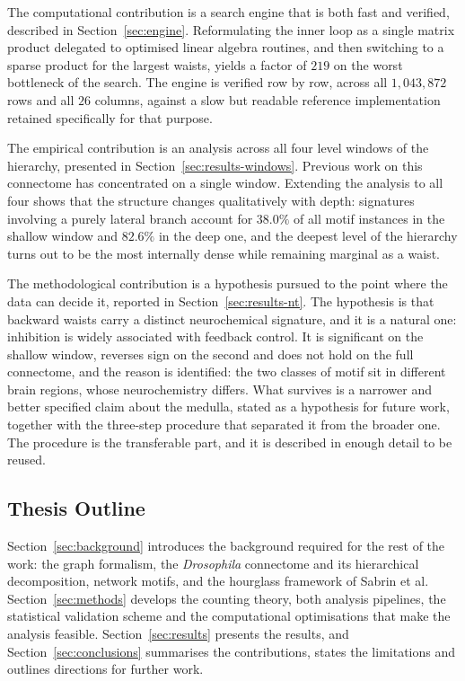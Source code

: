 \documentclass[12pt,a4paper,oneside]{article}
\theoremstyle{definition}
\theoremstyle{plain}
\newcommand{\Dros}{\textit{Drosophila}}
\begin{document}
The computational contribution is a search engine that is both fast and
verified, described in Section~\ref{sec:engine}. Reformulating the inner
loop as a single matrix product delegated to optimised linear algebra
routines, and then switching to a sparse product for the largest waists,
yields a factor of $219$ on the worst bottleneck of the search. The engine
is verified row by row, across all $1{,}043{,}872$ rows and all $26$
columns, against a slow but readable reference implementation retained
specifically for that purpose.

The empirical contribution is an analysis across all four level windows of
the hierarchy, presented in Section~\ref{sec:results-windows}. Previous work
on this connectome has concentrated on a single window. Extending the
analysis to all four shows that the structure changes qualitatively with
depth: signatures involving a purely lateral branch account for $38.0\%$ of
all motif instances in the shallow window and $82.6\%$ in the deep one, and
the
deepest level of the hierarchy turns out to be the most internally dense
while remaining marginal as a waist.

The methodological contribution is a hypothesis pursued to the point where
the data can decide it, reported in Section~\ref{sec:results-nt}. The
hypothesis is that backward waists carry a distinct neurochemical signature,
and it is a natural one: inhibition is widely associated with feedback
control. It is significant on the shallow window, reverses sign on the
second and does not hold on the full connectome, and the reason is
identified: the two classes of motif sit in different brain regions, whose
neurochemistry differs. What survives is a narrower and better specified
claim about the medulla, stated as a hypothesis for future work, together
with the three-step procedure that separated it from the broader one. The
procedure is the transferable part, and it is described in enough detail to
be reused.

\subsection{Thesis Outline}
\label{sec:outline}

Section~\ref{sec:background} introduces the background required for the rest
of the work: the graph formalism, the \Dros{} connectome and its
hierarchical decomposition, network motifs, and the hourglass framework of
Sabrin et al. Section~\ref{sec:methods} develops the counting theory, both
analysis pipelines, the statistical validation scheme and the computational
optimisations that make the analysis feasible. Section~\ref{sec:results}
presents the results, and Section~\ref{sec:conclusions} summarises the
contributions, states the limitations and outlines directions for further
work.
\end{document}
